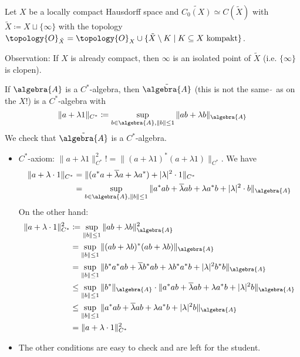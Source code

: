 \documentclass[a4paper]{article}
\begin{document}
\begin{exercise}[2.6]
	Let $X$ be a locally compact Hausdorff space and $\widetilde{C_0(X)} \simeq C(\tilde{X})$ with $\tilde{X} \coloneq X \sqcup \{\infty\}$ with the topology $\topology{O}_{\tilde{X}} = \topology{O}_X \cup \{ \tilde{X} \setminus K \mid K \subseteq X \text{ kompakt}\}$.

	Observation: If $X$ is already compact, then $\infty$ is an isolated point of $\tilde X$ (i.e. $\{\infty\}$ is clopen).

	If $\algebra{A}$ is a $C^*$-algebra, then $\tilde{\algebra{A}}$ (this is not the same $\tilde{~}$ as on the $X$!) is a $C^*$-algebra with 
	\begin{equation*}
		\|a + \lambda 1\|_{C^*} \coloneq \sup_{b \in \algebra{A}, \|b\| \leq 1} \| ab + \lambda b\|_\algebra{A}
	\end{equation*}
	We check that $\tilde{\algebra{A}}$ is a $C^*$-algebra.
	\begin{itemize}
		\item $C^*$-axiom: $\|a + \lambda 1\|_{C^*}^2 != \|(a + \lambda 1)^* (a + \lambda 1)\|_{C^*}$. We have
		\begin{align*}
			\|a + \lambda \cdot 1\|_{C^*} &= \|(a^*a + \overline{\lambda} a + \lambda a^*) + |\lambda|^2 \cdot 1 \|_{C^*}\\
			&= \sup_{b \in \algebra{A}, \|b\| \leq 1} \| a^*a b + \overline{\lambda} a b + \lambda a^*b + |\lambda|^2 \cdot b\|_\algebra{A}
		\end{align*}
		On the other hand:
		\begin{align*}
			\|a + \lambda \cdot 1\|_{C^*}^2 &\coloneq \sup_{\|b\| \leq 1} \|ab + \lambda b\|_\algebra{A}^2\\
			&= \sup_{\|b\| \leq 1} \| (ab + \lambda b)^* (ab + \lambda b)\|_\algebra{A}\\
			&= \sup_{\|b\| \leq 1} \| b^* a^* a b + \overline{\lambda} b^* ab + \lambda b^* a^* b + |\lambda|^2 b^* b\|_\algebra{A}\\
			&\leq \sup_{\|b\| \leq 1} \|b^*\|_\algebra{A} \cdot \| a^* a b + \overline{\lambda} a b + \lambda  a^* b + |\lambda|^2 b\|_\algebra{A} \\
			&\leq \sup_{\|b\| \leq 1} \| a^* a b + \overline{\lambda} a b + \lambda a^* b + |\lambda|^2 b\|_\algebra{A}\\
			&= \|a + \lambda \cdot 1\|_{C^*}^2
		\end{align*}
		\item The other conditions are easy to check and are left for the student.		

\end{itemize}
\end{exercise}
\end{document}
